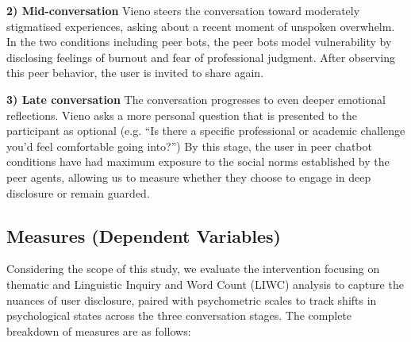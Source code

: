 \documentclass[sigconf]{acmart}
\begin{document}
\textbf{2) Mid-conversation} Vieno steers the conversation toward moderately stigmatised experiences, asking about a recent moment of unspoken overwhelm. In the two conditions including peer bots, the peer bots model vulnerability by disclosing feelings of burnout and fear of professional judgment. After observing this peer behavior, the user is invited to share again.

\textbf{3) Late conversation} The conversation progresses to even deeper emotional reflections. Vieno asks a more personal question that is presented to the participant as optional (e.g. ``Is there a specific professional or academic challenge you'd feel comfortable going into?'') By this stage, the user in peer chatbot conditions have had maximum exposure to the social norms established by the peer agents, allowing us to measure whether they choose to engage in deep disclosure or remain guarded.

\subsection{Measures (Dependent Variables)}

Considering the scope of this study, we evaluate the intervention focusing on thematic and Linguistic Inquiry and Word Count (LIWC) analysis to capture the nuances of user disclosure, paired with psychometric scales to track shifts in psychological states across the three conversation stages. The complete breakdown of measures are as follows:
\end{document}
